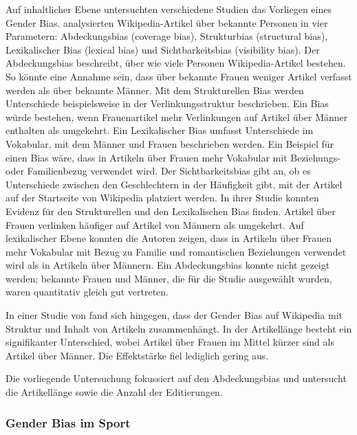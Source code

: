 \documentclass[11pt]{article}
\begin{document}
Auf inhaltlicher Ebene untersuchten verschiedene Studien das Vorliegen eines Gender Bias. \textcite{Wagner2015} analysierten Wikipedia-Artikel über bekannte Personen in vier Parametern: Abdeckungsbias (coverage bias), Strukturbias (structural bias), Lexikalischer Bias (lexical bias) und Sichtbarkeitsbias (visibility bias). Der Abdeckungsbias beschreibt, über wie viele Personen Wikipedia-Artikel bestehen. So könnte eine Annahme sein, dass über bekannte Frauen weniger Artikel verfasst werden als über bekannte Männer. Mit dem Strukturellen Bias werden Unterschiede beispielsweise in der Verlinkungsstruktur beschrieben. Ein Bias würde bestehen, wenn Frauenartikel mehr Verlinkungen auf Artikel über Männer enthalten als umgekehrt. Ein Lexikalischer Bias umfasst Unterschiede im Vokabular, mit dem Männer und Frauen beschrieben werden. Ein Beispiel für einen Bias wäre, dass in Artikeln über Frauen mehr Vokabular mit Beziehungs- oder Familienbezug verwendet wird. Der Sichtbarkeitsbias gibt an, ob es Unterschiede zwischen den Geschlechtern in der Häufigkeit gibt, mit der Artikel auf der Startseite von Wikipedia platziert werden.
In ihrer Studie konnten \textcite{Wagner2015} Evidenz für den Strukturellen und den Lexikalischen Bias finden. Artikel über Frauen verlinken häufiger auf Artikel von Männern als umgekehrt. Auf lexikalischer Ebene konnten die Autoren zeigen, dass in Artikeln über Frauen mehr Vokabular mit Bezug zu Familie und romantischen Beziehungen verwendet wird als in Artikeln über Männern. Ein Abdeckungsbias konnte nicht gezeigt werden; bekannte Frauen und Männer, die für die Studie ausgewählt wurden, waren quantitativ gleich gut vertreten.

In einer Studie von  \textcite{GraellsGarrido2015} fand sich hingegen, dass der Gender Bias auf Wikipedia mit Struktur und Inhalt von Artikeln zusammenhängt. In der Artikellänge besteht ein signifikanter Unterschied, wobei Artikel über Frauen im Mittel kürzer sind als Artikel über Männer. Die Effektstärke fiel lediglich gering aus.

Die vorliegende Untersuchung fokussiert auf den Abdeckungsbias und untersucht die Artikellänge sowie die Anzahl der Editierungen.

\subsubsection{Gender Bias im Sport}
\end{document}
